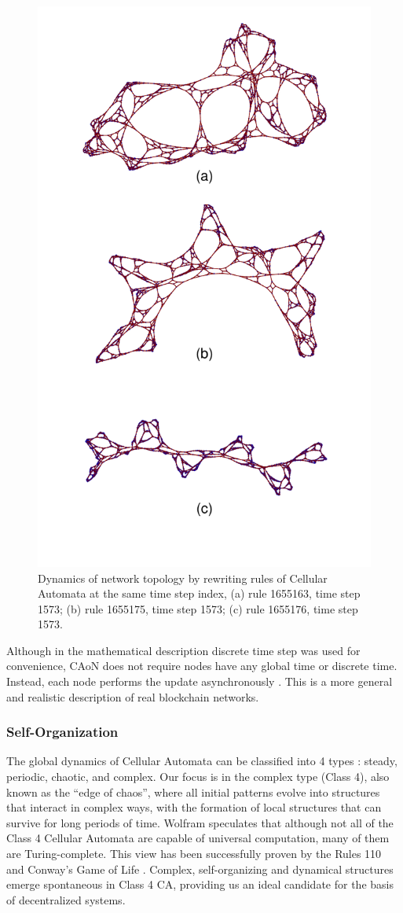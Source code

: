 \documentclass[reprint,pre,aps]{revtex4-1}
\begin{document}
\begin{figure}[!htp]
\centering
\includegraphics[width=0.6\linewidth]{fig/ca_network_dynamics}
\caption{Dynamics of network topology by rewriting rules of Cellular Automata at the same time step index, (a) rule 1655163, time step 1573; (b) rule 1655175, time step 1573; (c) rule 1655176, time step 1573.}
\label{fig:ca_network_dynamics}
\end{figure}

Although in the mathematical description discrete time step was used for convenience, CAoN does not require nodes have any global time or discrete time. Instead, each node performs the update asynchronously \cite{chopard1998cellular}. This is a more general and realistic description of real blockchain networks.

\subsubsection{Self-Organization}

The global dynamics of Cellular Automata can be classified into 4 types \cite{wolfram2002new}: steady, periodic, chaotic, and complex. Our focus is in the complex type (Class 4), also known as the “edge of chaos”, where all initial patterns evolve into structures that interact in complex ways, with the formation of local structures that can survive for long periods of time. Wolfram speculates that although not all of the Class 4 Cellular Automata are capable of universal computation, many of them are Turing-complete. This view has been successfully proven by the Rules 110 \cite{wolfram2002new, cook2004universality} and Conway's Game of Life \cite{conway1970game}. Complex, self-organizing and dynamical structures emerge spontaneous in Class 4 CA, providing us an ideal candidate for the basis of decentralized systems.
\end{document}
